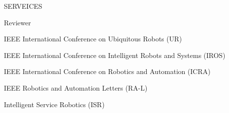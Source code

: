 \begin{rSection}{SERVEICES}{}{}{}        
    \begin{rSubsection}{Reviewer}{}{}{}                
        \item IEEE International Conference on Ubiquitous Robots (UR)
        \item IEEE International Conference on Intelligent Robots and Systems (IROS)
        \item IEEE International Conference on Robotics and Automation (ICRA)                
        \item IEEE Robotics and Automation Letters (RA-L)        
        \item Intelligent Service Robotics (ISR)
        
     \end{rSubsection}  
 \end{rSection}

